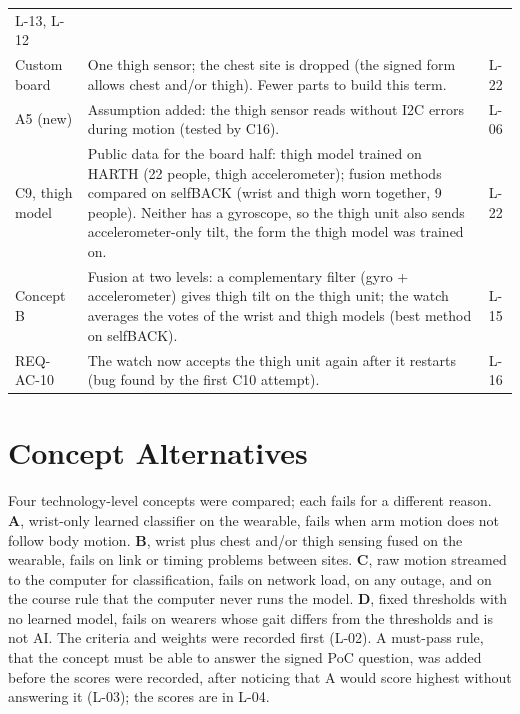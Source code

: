 \documentclass[conference]{IEEEtran}
\begin{document}
\begin{table}[H]
\begin{tabular}{p{1.35cm}p{5.65cm}p{0.85cm}}
L-13, L-12 \\
Custom board & One thigh sensor; the chest site is dropped (the signed
form allows chest and/or thigh). Fewer parts to build this term. &
L-22 \\
A5 (new) & Assumption added: the thigh sensor reads without I2C
errors during motion (tested by C16). &
L-06 \\
C9, thigh model & Public data for the board half: thigh model trained
on HARTH (22 people, thigh accelerometer); fusion methods compared on
selfBACK (wrist and thigh worn together, 9 people). Neither has a
gyroscope, so the thigh unit also sends accelerometer-only tilt, the
form the thigh model was trained on. &
L-22 \\
Concept B & Fusion at two levels: a complementary filter (gyro +
accelerometer) gives thigh tilt on the thigh unit; the watch averages
the votes of the wrist and thigh models (best method on selfBACK). &
L-15 \\
REQ-AC-10 & The watch now accepts the thigh unit again after it
restarts (bug found by the first C10 attempt). &
L-16 \\
\bottomrule
\end{tabular}
\end{table}

\section{Concept Alternatives}
\label{sec:concepts}

Four technology-level concepts were compared; each fails for a
different reason. \textbf{A}, wrist-only learned classifier on the
wearable, fails when arm motion does not follow body motion.
\textbf{B}, wrist plus chest and/or thigh sensing fused on the
wearable, fails on link or timing problems between sites.
\textbf{C}, raw motion streamed to the computer for classification,
fails on network load, on any outage, and on the course rule that
the computer never runs the model. \textbf{D}, fixed thresholds with
no learned model, fails on wearers whose gait differs from the
thresholds and is not AI. The criteria and weights were recorded
first (L-02). A must-pass rule, that the concept must be able to answer
the signed PoC question, was added before the scores were recorded,
after noticing that A would score highest without answering it (L-03);
the scores are in L-04.
\end{document}
